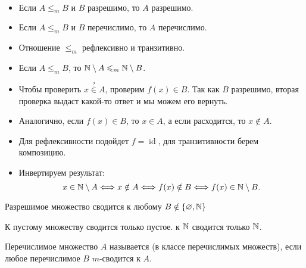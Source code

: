 \begin{prop}
	~\begin{itemize}
		\item Если $ A \le _{m} B$ и $ B$ разрешимо, то $ A$ разрешимо.
		\item Если $ A \le _{m} B$ и $ B$ перечислимо, то $ A$ перечислимо.
		\item Отношение $ \le _{m}$ рефлексивно и транзитивно.
		\item Если $ A \le _{m} B$, то $ \mathbb{N} \setminus A \leqslant _{m} \mathbb{N} \setminus B$.
	\end{itemize}
\end{prop}
\begin{proof*}
	\begin{itemize}
		\item Чтобы  проверить $ x \stackrel{?}{\in} A$, проверим $ f(x) \in B$. Так как $ B$ разрешимо, вторая проверка выдаст какой-то ответ и мы можем его вернуть.
		\item Аналогично, если $ f(x) \in B$, то $ x \in A$, а если расходится, то $ x \notin A$.
		\item Для рефлексивности подойдет $ f = \operatorname{id}$, для транзитивности берем композицию. 
		\item Инвертируем результат:
			\[
				x \in \mathbb{N} \setminus A \Longleftrightarrow x \notin A \Longleftrightarrow f(x) \notin B \Longleftrightarrow f(x) \in \mathbb{N} \setminus B
			.\] 
	\end{itemize}
\end{proof*}
\begin{note}
    Разрешимое множество сводится к любому $ B \notin \{\varnothing, \mathbb{N}\}$
\end{note}
\begin{note}
    К пустому множеству сводится только пустое. к $ \mathbb{N}$ сводится только $ \mathbb{N}$.
\end{note}


\begin{defn}[$ m$-полнота]
	Перечислимое множество $ A$ называется  (в классе перечислимых множеств), если любое перечислимое $ B$  $ m$-сводится к $ A$.
\end{defn}


